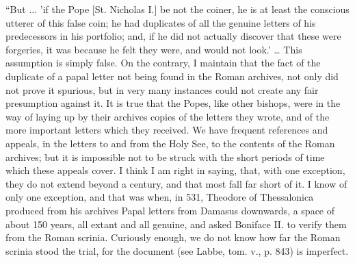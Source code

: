 ``But ... 'if the Pope [St. Nicholas I.] be not
the coiner, he is at least the conscious utterer of this false coin;
he had duplicates of all the genuine letters of his predecessors in
his portfolio; and, if he did not actually discover that these were
forgeries, it was because he felt they were, and would not look.' …
This assumption is simply false. On the contrary, I maintain that the
fact of the duplicate of a papal letter not being found in the Roman
archives, not only did not prove it spurious, but in very many
instances could not create any fair presumption against it. It is true
that the Popes, like other bishops, were in the way of laying up by
their archives copies of the letters they wrote, and of the more
important letters which they received. We have frequent references and appeals, in the letters to and from the Holy See, to
the contents of the Roman archives; but it is impossible not to be
struck with the short periods of time which these appeals cover. I
think I am right in saying, that, with one exception, they do not
extend beyond a century, and that most fall far short of it. I know of
only one exception, and that was when, in 531, Theodore of
Thessalonica produced from his archives Papal letters from Damasus
downwards, a space of about 150 years, all extant and all genuine, and
asked Boniface II. to verify them from the Roman scrinia. Curiously
enough, we do not know how far the Roman scrinia stood the trial, for
the document (see Labbe, tom. v., p. 843) is imperfect.

